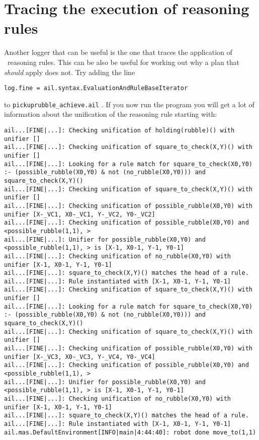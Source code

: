 \section{Tracing the execution of reasoning rules}
Another logger that can be useful is the one that traces the application of \prolog\ reasoning rules.  This can be also be useful for working out why a plan that \emph{should} apply does not.  Try adding the line
\begin{verbatim}
log.fine = ail.syntax.EvaluationAndRuleBaseIterator
\end{verbatim}
to \texttt{pickuprubble\_achieve.ail} .  If you now run the program you will get a lot of information about the unification of the reasoning rule starting with:

\begin{small}
\begin{verbatim}
ail...[FINE|...]: Checking unification of holding(rubble)() with unifier [] 
ail...[FINE|...]: Checking unification of square_to_check(X,Y)() with unifier [] 
ail...[FINE|...]: Looking for a rule match for square_to_check(X0,Y0) :- (possible_rubble(X0,Y0) & not (no_rubble(X0,Y0))) and square_to_check(X,Y)() 
ail...[FINE|...]: Checking unification of square_to_check(X,Y)() with unifier [] 
ail...[FINE|...]: Checking unification of possible_rubble(X0,Y0) with unifier [X-_VC1, X0-_VC1, Y-_VC2, Y0-_VC2] 
ail...[FINE|...]: Checking unification of possible_rubble(X0,Y0) and <possible_rubble(1,1), > 
ail...[FINE|...]: Unifier for possible_rubble(X0,Y0) and <possible_rubble(1,1), > is [X-1, X0-1, Y-1, Y0-1] 
ail...[FINE|...]: Checking unification of no_rubble(X0,Y0) with unifier [X-1, X0-1, Y-1, Y0-1] 
ail...[FINE|...]: square_to_check(X,Y)() matches the head of a rule. 
ail...[FINE|...]: Rule instantiated with [X-1, X0-1, Y-1, Y0-1] 
ail...[FINE|...]: Checking unification of square_to_check(X,Y)() with unifier [] 
ail...[FINE|...]: Looking for a rule match for square_to_check(X0,Y0) :- (possible_rubble(X0,Y0) & not (no_rubble(X0,Y0))) and square_to_check(X,Y)() 
ail...[FINE|...]: Checking unification of square_to_check(X,Y)() with unifier [] 
ail...[FINE|...]: Checking unification of possible_rubble(X0,Y0) with unifier [X-_VC3, X0-_VC3, Y-_VC4, Y0-_VC4] 
ail...[FINE|...]: Checking unification of possible_rubble(X0,Y0) and <possible_rubble(1,1), > 
ail...[FINE|...]: Unifier for possible_rubble(X0,Y0) and <possible_rubble(1,1), > is [X-1, X0-1, Y-1, Y0-1] 
ail...[FINE|...]: Checking unification of no_rubble(X0,Y0) with unifier [X-1, X0-1, Y-1, Y0-1] 
ail...[FINE|...]: square_to_check(X,Y)() matches the head of a rule. 
ail...[FINE|...]: Rule instantiated with [X-1, X0-1, Y-1, Y0-1] 
ail.mas.DefaultEnvironment[INFO|main|4:44:40]: robot done move_to(1,1) 
\end{verbatim}
\end{small}

